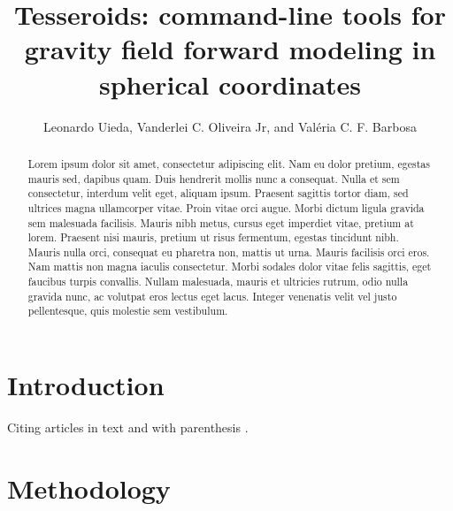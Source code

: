 \documentclass[paper,twocolumn,twoside]{geophysics}
\begin{document}
\title{
    Tesseroids:
    command-line tools for
    gravity field forward modeling
    in spherical coordinates
}

\ms{}

\address{
    \footnotemark[1]
    Universidade do Estado do Rio de Janeiro, Rio de Janeiro, Brazil,
    e-mail: leouieda@gmail.com;\\
    \footnotemark[2]
    Observat\'orio Nacional, Rio de Janeiro, Brazil;
}

\author{Leonardo Uieda\footnotemark[1]\footnotemark[2],
        Vanderlei C. Oliveira Jr\footnotemark[2],
        and
        Val\'eria C. F. Barbosa\footnotemark[2]}



\begin{abstract}
Lorem ipsum dolor sit amet, consectetur adipiscing elit. Nam eu dolor pretium,
egestas mauris sed, dapibus quam. Duis hendrerit mollis nunc a consequat. Nulla
et sem consectetur, interdum velit eget, aliquam ipsum. Praesent sagittis
tortor diam, sed ultrices magna ullamcorper vitae. Proin vitae orci augue.
Morbi dictum ligula gravida sem malesuada facilisis. Mauris nibh metus, cursus
eget imperdiet vitae, pretium at lorem. Praesent nisi mauris, pretium ut risus
fermentum, egestas tincidunt nibh. Mauris nulla orci, consequat eu pharetra
non, mattis ut urna. Mauris facilisis orci eros. Nam mattis non magna iaculis
consectetur. Morbi sodales dolor vitae felis sagittis, eget faucibus turpis
convallis. Nullam malesuada, mauris et ultricies rutrum, odio nulla gravida
nunc, ac volutpat eros lectus eget lacus. Integer venenatis velit vel justo
pellentesque, quis molestie sem vestibulum.
\end{abstract}

\section{Introduction}

Citing articles in text \citet{Asgharzadeh2007} and with parenthesis
\citep{Braitenberg2011}.


\section{Methodology}
\end{document}
